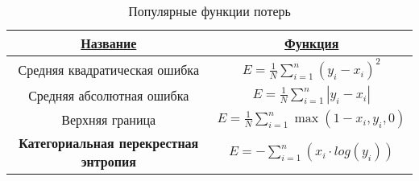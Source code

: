 \begin{table}[H]
  \centering
  \caption{Популярные функции потерь} \label{loss_funcs}
  \begin{tabular}{|c|c|}
    \hline    
    \hyperlink{name}{Название} & \hyperlink{func}{Функция}\\
    \hline
    Средняя квадратическая ошибка & $E=\frac{1}{N}\displaystyle\sum\limits_{i=1}^{n}(y_i - x_i)^2$\\
    \hline
    Средняя абсолютная ошибка & $E=\frac{1}{N}\displaystyle\sum\limits_{i=1}^{n}|y_i - x_i|$ \\
    \hline
    Верхняя граница & $E=\frac{1}{N}\displaystyle\sum\limits_{i=1}^{n}\max(1-x_i, y_i, 0)$ \\
    \hline
    \textbf{Категориальная перекрестная энтропия} & $E=-\displaystyle\sum\limits_{i=1}^{n}(x_i \cdot log(y_i))$ \\
    \hline
  \end{tabular}
\end{table}